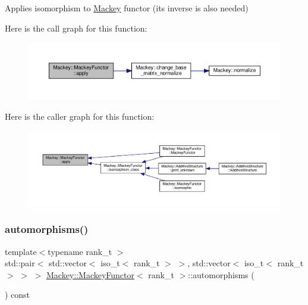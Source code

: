 Applies isomorphism to \hyperlink{namespaceMackey}{Mackey} functor (its inverse is also needed) 

Here is the call graph for this function\+:\nopagebreak
\begin{figure}[H]
\begin{center}
\leavevmode
\includegraphics[width=350pt]{classMackey_1_1MackeyFunctor_a6522cfe1071ccb92ff3db38d89e14687_cgraph}
\end{center}
\end{figure}
Here is the caller graph for this function\+:\nopagebreak
\begin{figure}[H]
\begin{center}
\leavevmode
\includegraphics[width=350pt]{classMackey_1_1MackeyFunctor_a6522cfe1071ccb92ff3db38d89e14687_icgraph}
\end{center}
\end{figure}
\mbox{\label{classMackey_1_1MackeyFunctor_ac7ef9ab9f3a13660a03c35e64dddd66b}} 
\subsubsection{\texorpdfstring{automorphisms()}{automorphisms()}}
{\footnotesize\ttfamily template$<$typename rank\+\_\+t $>$ \\
std\+::pair$<$ std\+::vector$<$ iso\+\_\+t$<$ rank\+\_\+t $>$ $>$, std\+::vector$<$ iso\+\_\+t$<$ rank\+\_\+t $>$ $>$ $>$ \hyperlink{classMackey_1_1MackeyFunctor}{Mackey\+::\+Mackey\+Functor}$<$ rank\+\_\+t $>$\+::automorphisms (\begin{DoxyParamCaption}{ }\end{DoxyParamCaption}) const}



